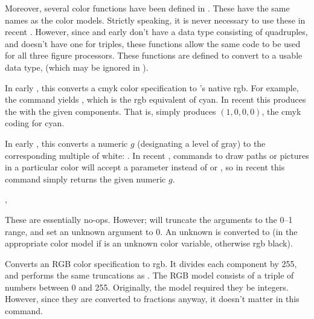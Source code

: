 \documentclass[letterpaper]{article}
\begin{document}
Moreover, several \MP{} color functions have been defined in
. These have the same names as the color models.
Strictly speaking, it is never necessary to use these in recent \MP{}.
However, since \MF{} and early \MP{} don't have a data type consisting
of quadruples, and \MF{} doesn't have one for triples, these functions
allow the same \mfp{} code to be used for all three figure processors.
These functions are defined to convert to a usable data type, (which may
be ignored in \MF{}).

\begin{cd}
%
\end{cd}

In early \MP{}, this converts a cmyk color specification to \MP{}'s
native rgb. For example, the command  yields
, which is the rgb equivalent of cyan. In recent \MP{} this
produces the  with the given components. That is,
 simply produces $(1,0,0,0)$, the cmyk coding for
cyan.

\begin{cd}
%
\end{cd}

In early \MP{}, this converts a numeric $g$ (designating a level of
gray) to the corresponding multiple of white: . In
recent \MP{}, commands to draw paths or pictures in a particular color
will accept a  parameter instead of  or
, so in recent \MP{} this command simply returns the given
numeric $g$.

\begin{cd}
,
%
%
\end{cd}

These are essentially no-ops. However;  will truncate the
arguments to the 0--1 range, and set an unknown argument to 0. An
unknown  is converted to  (in the appropriate
color model if  is an unknown color variable, otherwise rgb
black).

\begin{cd}
%
\end{cd}

Converts an RGB color specification to rgb. It divides each component by
255, and performs the same truncations as . The RGB model
consists of a triple of numbers between 0 and 255. Originally, the model
required they be integers. However, since they are converted to
fractions anyway, it doesn't matter in this command.
\end{document}

